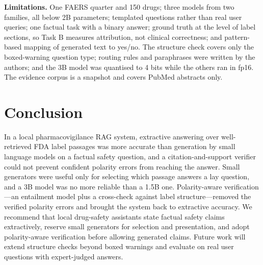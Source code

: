 \documentclass[conference]{IEEEtran}
\begin{document}
\textbf{Limitations.} One FAERS quarter and 150 drugs; three models from two families, all below 2B parameters; templated questions rather than real user queries; one factual task with a binary answer; ground truth at the level of label sections, so Task B measures attribution, not clinical correctness; and pattern-based mapping of generated text to yes/no. The structure check covers only the boxed-warning question type; routing rules and paraphrases were written by the authors; and the 3B model was quantised to 4 bits while the others ran in fp16. The evidence corpus is a snapshot and covers PubMed abstracts only.

\section{Conclusion}
In a local pharmacovigilance RAG system, extractive answering over well-retrieved FDA label passages was more accurate than generation by small language models on a factual safety question, and a citation-and-support verifier could not prevent confident polarity errors from reaching the answer. Small generators were useful only for selecting which passage answers a lay question, and a 3B model was no more reliable than a 1.5B one. Polarity-aware verification---an entailment model plus a cross-check against label structure---removed the verified polarity errors and brought the system back to extractive accuracy. We recommend that local drug-safety assistants state factual safety claims extractively, reserve small generators for selection and presentation, and adopt polarity-aware verification before allowing generated claims. Future work will extend structure checks beyond boxed warnings and evaluate on real user questions with expert-judged answers.



\end{document}
